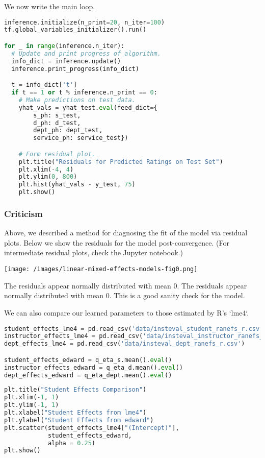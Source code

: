 We now write the main loop.

\begin{lstlisting}[language=Python]
inference.initialize(n_print=20, n_iter=100)
tf.global_variables_initializer().run()

for _ in range(inference.n_iter):
  # Update and print progress of algorithm.
  info_dict = inference.update()
  inference.print_progress(info_dict)

  t = info_dict['t']
  if t == 1 or t % inference.n_print == 0:
    # Make predictions on test data.
    yhat_vals = yhat_test.eval(feed_dict={
        s_ph: s_test,
        d_ph: d_test,
        dept_ph: dept_test,
        service_ph: service_test})

    # Form residual plot.
    plt.title("Residuals for Predicted Ratings on Test Set")
    plt.xlim(-4, 4)
    plt.ylim(0, 800)
    plt.hist(yhat_vals - y_test, 75)
    plt.show()
\end{lstlisting}

\subsubsection{Criticism}

Above, we described a method for diagnosing the fit of the model via
residual plots.
Below we show the residuals for the model post-convergence. (For
intermediate residual plots, check the Jupyter notebook.)

\texttt{[image: /images/linear-mixed-effects-models-fig0.png]}

The residuals appear normally distributed with mean 0. The residuals
appear normally distributed with mean 0. This is a good
sanity check for the model.

We can also compare our learned parameters to those estimated by R's
`lme4`.

\begin{lstlisting}[language=Python]
student_effects_lme4 = pd.read_csv('data/insteval_student_ranefs_r.csv')
instructor_effects_lme4 = pd.read_csv('data/insteval_instructor_ranefs_r.csv')
dept_effects_lme4 = pd.read_csv('data/insteval_dept_ranefs_r.csv')

student_effects_edward = q_eta_s.mean().eval()
instructor_effects_edward = q_eta_d.mean().eval()
dept_effects_edward = q_eta_dept.mean().eval()
\end{lstlisting}

\begin{lstlisting}[language=Python]
plt.title("Student Effects Comparison")
plt.xlim(-1, 1)
plt.ylim(-1, 1)
plt.xlabel("Student Effects from lme4")
plt.ylabel("Student Effects from edward")
plt.scatter(student_effects_lme4["(Intercept)"],
            student_effects_edward,
            alpha = 0.25)
plt.show()
\end{lstlisting}

